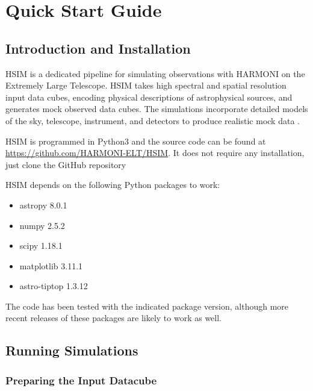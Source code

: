 \documentclass[12pt]{report}
\begin{document}
\clearpage

\chapter{Quick Start Guide}

\section{Introduction and Installation}

HSIM is a dedicated pipeline for simulating observations with HARMONI on the Extremely Large Telescope. HSIM takes high spectral and spatial resolution input data cubes, encoding physical descriptions of astrophysical sources, and generates mock observed data cubes. The simulations incorporate detailed models of the sky, telescope, instrument, and detectors to produce realistic mock data \citep{Zieleniewski2015}.

HSIM is programmed in Python3 and the source code can be found at \url{https://github.com/HARMONI-ELT/HSIM}. It does not require any installation, just clone the GitHub repository


HSIM depends on the following Python packages to work:

\begin{itemize}
\setlength\itemsep{-0.5ex}
\item astropy 8.0.1
\item numpy 2.5.2
\item scipy 1.18.1
\item matplotlib 3.11.1
\item astro-tiptop 1.3.12
\end{itemize}

The code has been tested with the indicated package version, although more recent releases of these packages are likely to work as well.


\section{Running Simulations}

\subsection{Preparing the Input Datacube}
\end{document}
